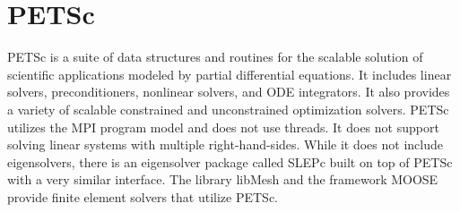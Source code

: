 \section{PETSc}
PETSc is a suite of data structures and routines for the scalable solution of
scientific applications modeled by partial differential equations.
It includes linear solvers, preconditioners, nonlinear solvers, and ODE integrators. It also provides a variety of scalable constrained and unconstrained optimization solvers.
PETSc utilizes the MPI program model and does not use threads. It does not support solving linear systems
with multiple right-hand-sides.  While it does not include eigensolvers, there
is an eigensolver package called SLEPc built on top of PETSc with a very similar
interface. The library libMesh and the framework MOOSE provide finite element solvers that utilize PETSc.

